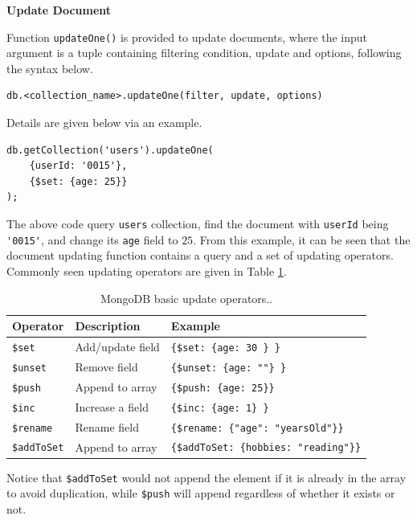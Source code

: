 \vspace{0.1in}
\noindent \textbf{Update Document}
\vspace{0.1in}

Function \verb|updateOne()| is provided to update documents, where the input argument is a tuple containing filtering condition, update and options, following the syntax below.
\begin{lstlisting}
db.<collection_name>.updateOne(filter, update, options)
\end{lstlisting}
Details are given below via an example.
\begin{lstlisting}
db.getCollection('users').updateOne(
	{userId: '0015'},
	{$set: {age: 25}}
);
\end{lstlisting}
The above code query \verb|users| collection, find the document with \verb|userId| being \verb|'0015'|, and change its \verb|age| field to $25$. From this example, it can be seen that the document updating function contains a query and a set of updating operators. Commonly seen updating operators are given in Table \ref{ch:db:tab:mongodbupdateoperator}.

\begin{table}
	\centering \caption{MongoDB basic update operators..}\label{ch:db:tab:mongodbupdateoperator}
	\begin{tabularx}{\textwidth}{llX}
		\hline
		Operator & Description & Example \\ \hline
		\verb|$set| & Add/update field & \verb|{$set: {age: 30 } }| \\ 
		\verb|$unset| & Remove field & \verb|{$unset: {age: ""} }| \\ 
		\verb|$push| & Append to array & \verb|{$push: {age: 25}}| \\ 
		\verb|$inc| & Increase a field & \verb|{$inc: {age: 1} }| \\ 
		\verb|$rename| & Rename field &  \verb|{$rename: {"age": "yearsOld"}}| \\ 
		\verb|$addToSet| & Append to array & \verb|{$addToSet: {hobbies: "reading"}}| \\
		\hline
	\end{tabularx}
	\begin{flushleft}
		\footnotesize
		Notice that \verb|$addToSet| would not append the element if it is already in the array to avoid duplication, while \verb|$push| will append regardless of whether it exists or not.  
	\end{flushleft}
\end{table}

